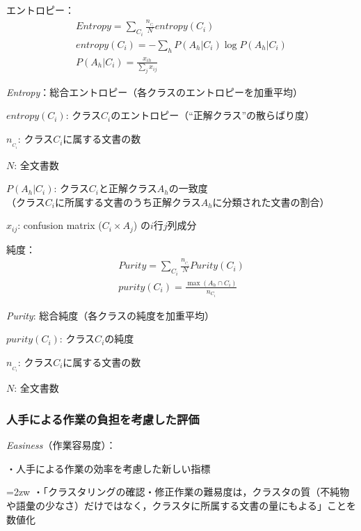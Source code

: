 \documentclass[japanese]{jnlp_1.4}
\begin{document}
\noindent
エントロピー：
\begin{gather*}
\mathit{Entropy}=\sum_{C_{i}} \frac{n_{{}_{C_{i}}}}{N} \mathit{entropy}(C_{i}) \\
\mathit{entropy}(C_{i}) = -\sum_{h} P(A_{h}|C_{i}) \log P (A_{h}|C_{i}) \\
P(A_{h}|C_{i}) = \frac{x_{ih}}{\sum_{j}x_{ij}}
\end{gather*}

\noindent
\textit{Entropy}：総合エントロピー（各クラスのエントロピーを加重平均）

\noindent
$\mathit{entropy}(C_{i})$: クラス$C_{i}$のエントロピー（``正解クラス''の散らばり度）

\noindent
$n_{{}_{C_{i}}}$: クラス$C_{i}$に属する文書の数

\noindent
$N$: 全文書数

\noindent
$P(A_{h}|C_{i})$: クラス$C_{i}$と正解クラス$A_{h}$の一致度\\
（クラス$C_{i}$に所属する文書のうち正解クラス$A_{h}$に分類された文書の割合）

\noindent
$x_{ij}$: confusion matrix ($C_{i} \times A_{j}$) の$i$行$j$列成分

\noindent
純度：
\begin{gather*}
 \mathit{Purity} = \sum_{C_{i}} \frac{n_{{}_{C_{i}}}}{N} \mathit{Purity} (C_{i}) \\
 \mathit{purity}(C_{i}) = \frac{\max (A_{h}\cap C_{i})}{n_{C_{i}}}
\end{gather*}

\noindent
\textit{Purity}: 総合純度（各クラスの純度を加重平均）

\noindent
$\mathit{purity}(C_{i})$: クラス$C_{i}$の純度

\noindent
$n_{{}_{C_{i}}}$: クラス$C_{i}$に属する文書の数

\noindent
$N$: 全文書数


\subsubsection{人手による作業の負担を考慮した評価}

\textit{Easiness}（作業容易度）：

・人手による作業の効率を考慮した新しい指標

\hangindent=2zw
・「クラスタリングの確認・修正作業の難易度は，クラスタの質（不純物や語彙の少なさ）だけではなく，クラスタに所属する文書の量にもよる」ことを数値化
\end{document}
